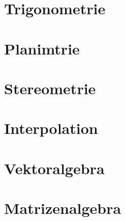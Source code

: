 \section{Trigonometrie}
\section{Planimtrie}
\section{Stereometrie}
\section{Interpolation}
\section{Vektoralgebra}
\section{Matrizenalgebra}


